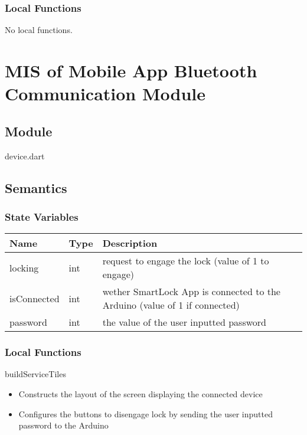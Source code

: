 \documentclass[12pt, titlepage]{article}
\begin{document}
\subsubsection{Local Functions}

No local functions.




\section{MIS of Mobile App Bluetooth Communication Module} \label{mHD}

\subsection{Module}
device.dart

\subsection{Semantics}

\subsubsection{State Variables}

\begin{center}
\begin{tabular}{p{4cm} p{4cm} p{6cm}}
\hline
\textbf{Name} & \textbf{Type} & \textbf{Description} \\
\hline
locking & int & request to engage the lock (value of 1 to engage) \\
isConnected & int & wether SmartLock App is connected to the Arduino (value of 1 if connected) \\
password & int & the value of the user inputted password \\
\hline
\end{tabular}
\end{center}

\subsubsection{Local Functions}

\noindent buildServiceTiles
\begin{itemize}
\item Constructs the layout of the screen displaying the connected device
\item Configures the buttons to disengage lock by sending the user inputted password to the Arduino 
\end{itemize}
\end{document}

